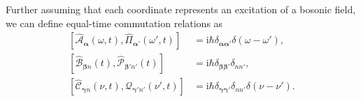 \documentclass{article}
\begin{document}
Further assuming that each coordinate represents an excitation of a bosonic field, we can define equal-time commutation relations as
\begin{equation}
\begin{split}
\left[\hat{\mathcal{A}}_{\bm{\alpha}}(\omega,t),\hat{\mathit{\Pi}}_{\bm{\alpha}'}(\omega',t)\right] &= \mathrm{i}\hbar\delta_{\bm{\alpha}\bm{\alpha}'}\delta(\omega - \omega'),\\
\left[\hat{\mathcal{B}}_{\bm{\beta}n}(t),\hat{\mathcal{P}}_{\bm{\beta}'n'}(t)\right] &= \mathrm{i}\hbar\delta_{\bm{\beta}\bm{\beta}'}\delta_{nn'},\\
\left[\hat{\mathcal{C}}_{\bm{\gamma}n}(\nu,t),\hat{\mathcal{Q}}_{\bm{\gamma'}n'}(\nu',t)\right] &= \mathrm{i}\hbar\delta_{\bm{\gamma}\bm{\gamma}'}\delta_{nn'}\delta(\nu - \nu').
\end{split}
\end{equation}
\end{document}
